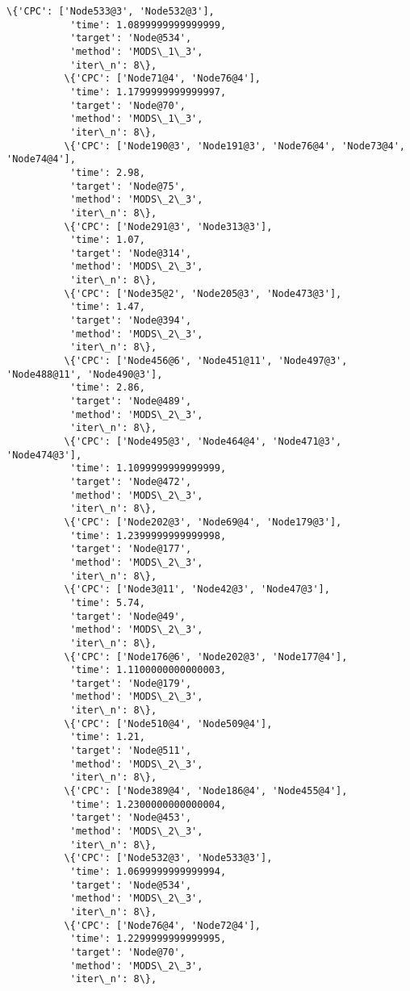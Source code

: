 \documentclass[11pt]{article}
\begin{document}
\begin{Verbatim}[commandchars=\\\{\}]
          \{'CPC': ['Node533@3', 'Node532@3'],
           'time': 1.0899999999999999,
           'target': 'Node@534',
           'method': 'MODS\_1\_3',
           'iter\_n': 8\},
          \{'CPC': ['Node71@4', 'Node76@4'],
           'time': 1.1799999999999997,
           'target': 'Node@70',
           'method': 'MODS\_1\_3',
           'iter\_n': 8\},
          \{'CPC': ['Node190@3', 'Node191@3', 'Node76@4', 'Node73@4', 'Node74@4'],
           'time': 2.98,
           'target': 'Node@75',
           'method': 'MODS\_2\_3',
           'iter\_n': 8\},
          \{'CPC': ['Node291@3', 'Node313@3'],
           'time': 1.07,
           'target': 'Node@314',
           'method': 'MODS\_2\_3',
           'iter\_n': 8\},
          \{'CPC': ['Node35@2', 'Node205@3', 'Node473@3'],
           'time': 1.47,
           'target': 'Node@394',
           'method': 'MODS\_2\_3',
           'iter\_n': 8\},
          \{'CPC': ['Node456@6', 'Node451@11', 'Node497@3', 'Node488@11', 'Node490@3'],
           'time': 2.86,
           'target': 'Node@489',
           'method': 'MODS\_2\_3',
           'iter\_n': 8\},
          \{'CPC': ['Node495@3', 'Node464@4', 'Node471@3', 'Node474@3'],
           'time': 1.1099999999999999,
           'target': 'Node@472',
           'method': 'MODS\_2\_3',
           'iter\_n': 8\},
          \{'CPC': ['Node202@3', 'Node69@4', 'Node179@3'],
           'time': 1.2399999999999998,
           'target': 'Node@177',
           'method': 'MODS\_2\_3',
           'iter\_n': 8\},
          \{'CPC': ['Node3@11', 'Node42@3', 'Node47@3'],
           'time': 5.74,
           'target': 'Node@49',
           'method': 'MODS\_2\_3',
           'iter\_n': 8\},
          \{'CPC': ['Node176@6', 'Node202@3', 'Node177@4'],
           'time': 1.1100000000000003,
           'target': 'Node@179',
           'method': 'MODS\_2\_3',
           'iter\_n': 8\},
          \{'CPC': ['Node510@4', 'Node509@4'],
           'time': 1.21,
           'target': 'Node@511',
           'method': 'MODS\_2\_3',
           'iter\_n': 8\},
          \{'CPC': ['Node389@4', 'Node186@4', 'Node455@4'],
           'time': 1.2300000000000004,
           'target': 'Node@453',
           'method': 'MODS\_2\_3',
           'iter\_n': 8\},
          \{'CPC': ['Node532@3', 'Node533@3'],
           'time': 1.0699999999999994,
           'target': 'Node@534',
           'method': 'MODS\_2\_3',
           'iter\_n': 8\},
          \{'CPC': ['Node76@4', 'Node72@4'],
           'time': 1.2299999999999995,
           'target': 'Node@70',
           'method': 'MODS\_2\_3',
           'iter\_n': 8\},

\end{Verbatim}
\end{document}
